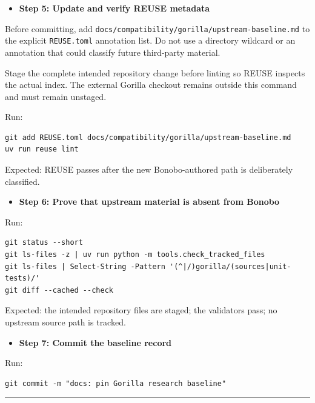 \documentclass[
  letterpaper,
]{article}
\providecommand{\tightlist}{%
  \setlength{\itemsep}{0pt}\setlength{\parskip}{0pt}}
\begin{document}
\begin{itemize}
\tightlist
\item[$\boxtimes$]
  \textbf{Step 5: Update and verify REUSE metadata}
\end{itemize}

Before committing, add \nolinkurl{docs/compatibility/gorilla/upstream-baseline.md} to the explicit
\nolinkurl{REUSE.toml} annotation list. Do not use a directory wildcard or an annotation that could classify future
third-party material.

Stage the complete intended repository change before linting so REUSE inspects the actual index. The external Gorilla
checkout remains outside this command and must remain unstaged.

Run:

\begin{lstlisting}
git add REUSE.toml docs/compatibility/gorilla/upstream-baseline.md
uv run reuse lint
\end{lstlisting}

Expected: REUSE passes after the new Bonobo-authored path is deliberately classified.

\begin{itemize}
\tightlist
\item[$\boxtimes$]
  \textbf{Step 6: Prove that upstream material is absent from Bonobo}
\end{itemize}

Run:

\begin{lstlisting}
git status --short
git ls-files -z | uv run python -m tools.check_tracked_files
git ls-files | Select-String -Pattern '(^|/)gorilla/(sources|unit-tests)/'
git diff --cached --check
\end{lstlisting}

Expected: the intended repository files are staged; the validators pass; no upstream source path is tracked.

\begin{itemize}
\tightlist
\item[$\boxtimes$]
  \textbf{Step 7: Commit the baseline record}
\end{itemize}

Run:

\begin{lstlisting}
git commit -m "docs: pin Gorilla research baseline"
\end{lstlisting}

\begin{center}\rule{0.5\linewidth}{0.5pt}\end{center}
\end{document}
